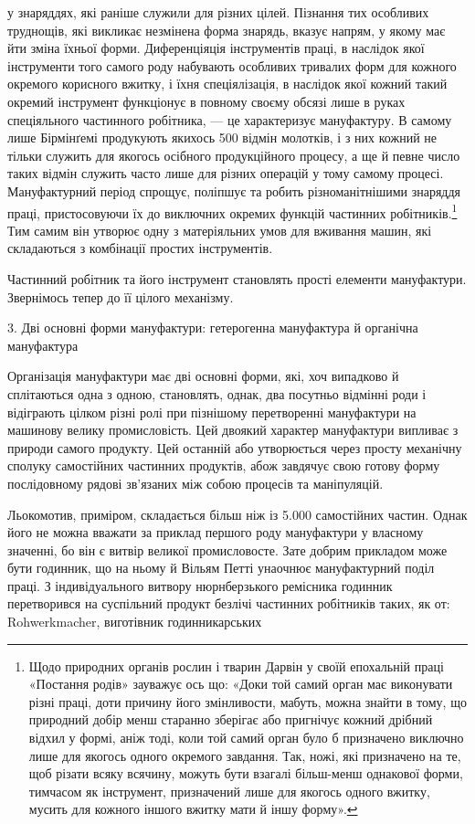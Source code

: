 у знаряддях, які раніше служили для різних цілей. Пізнання
тих особливих труднощів, які викликає незмінена форма знарядь,
вказує напрям, у якому має йти зміна їхньої форми. Диференціяція
інструментів праці, в наслідок якої інструменти того самого роду
набувають особливих тривалих форм для кожного окремого
корисного вжитку, і їхня спеціялізація, в наслідок якої кожний
такий окремий інструмент функціонує в повному своєму обсязі
лише в руках спеціяльного частинного робітника, — це характеризує мануфактуру. В самому лише
Бірмінґемі продукують
якихось 500 відмін молотків, і з них кожний не тільки служить
для якогось осібного продукційного процесу, а ще й певне число
таких відмін служить часто лише для різних операцій у тому
самому процесі. Мануфактурний період спрощує, поліпшує та
робить різноманітнішими знаряддя праці, пристосовуючи їх до
виключних окремих функцій частинних робітників.\footnote{
Щодо природних органів рослин і тварин Дарвін у своїй епохальній праці «Постання родів» зауважує
ось що: «Доки той самий орган має виконувати різні праці, доти причину його змінливости, мабуть,
можна знайти в тому, що природний добір менш старанно зберігає або пригнічує кожний дрібний відхил у
формі, аніж тоді, коли той самий орган було б призначено виключно лише для якогось одного окремого
завдання. Так, ножі, які призначено на те, щоб різати всяку всячину,
можуть бути взагалі більш-менш однакової форми, тимчасом як інструмент, призначений лише для якогось
одного вжитку, мусить для кожного
іншого вжитку мати й іншу форму».
} Тим самим
він утворює одну з матеріяльних умов для вживання машин,
які складаються з комбінації простих інструментів.

Частинний робітник та його інструмент становлять прості
елементи мануфактури. Звернімось тепер до її цілого механізму.

3. Дві основні форми мануфактури: гетерогенна мануфактура
й органічна мануфактура

Організація мануфактури має дві основні форми, які, хоч
випадково й сплітаються одна з одною, становлять, однак, два
посутньо відмінні роди і відіграють цілком різні ролі при пізнішому перетворенні мануфактури на
машинову велику промисловість. Цей двоякий характер мануфактури випливає з природи самого продукту.
Цей останній або утворюється через просту
механічну сполуку самостійних частинних продуктів, абож
завдячує свою готову форму послідовному рядові зв’язаних між
собою процесів та маніпуляцій.

Льокомотив, приміром, складається більш ніж із 5.000 самостійних частин. Однак його не можна вважати
за приклад першого роду мануфактури у власному значенні, бо він є витвір великої промисловосте. Зате
добрим прикладом може бути годинник,
що на ньому й Вільям Петті унаочнює мануфактурний поділ праці. З індивідуального витвору
нюрнберзького ремісника годинник перетворився на суспільний продукт безлічі частинних робітників
таких, як от: Rohwerkmacher, виготівник годинникарських